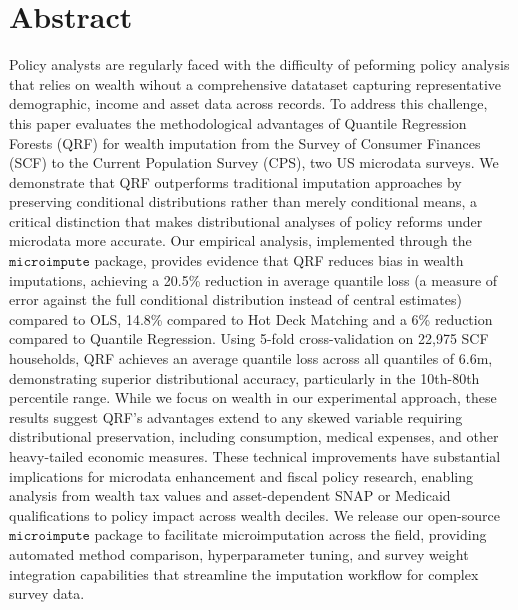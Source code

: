 \section*{Abstract}

Policy analysts are regularly faced with the difficulty of peforming policy analysis that relies on wealth wihout a comprehensive datataset capturing representative demographic, income and asset data across records. To address this challenge, this paper evaluates the methodological advantages of Quantile Regression Forests (QRF) for wealth imputation from the Survey of Consumer Finances (SCF) to the Current Population Survey (CPS), two US microdata surveys. We demonstrate that QRF outperforms traditional imputation approaches by preserving conditional distributions rather than merely conditional means, a critical distinction that makes distributional analyses of policy reforms under microdata more accurate. Our empirical analysis, implemented through the $\texttt{microimpute}$ package, provides evidence that QRF reduces bias in wealth imputations, achieving a 20.5\% reduction in average quantile loss (a measure of error against the full conditional distribution instead of central estimates) compared to OLS, 14.8\% compared to Hot Deck Matching and a 6\% reduction compared to Quantile Regression. Using 5-fold cross-validation on 22,975 SCF households, QRF achieves an average quantile loss across all quantiles of 6.6m, demonstrating superior distributional accuracy, particularly in the 10th-80th percentile range. While we focus on wealth in our experimental approach, these results suggest QRF's advantages extend to any skewed variable requiring distributional preservation, including consumption, medical expenses, and other heavy-tailed economic measures. These technical improvements have substantial implications for microdata enhancement and fiscal policy research, enabling analysis from wealth tax values and asset-dependent SNAP or Medicaid qualifications to policy impact across wealth deciles. We release our open-source $\texttt{microimpute}$ package to facilitate microimputation across the field, providing automated method comparison, hyperparameter tuning, and survey weight integration capabilities that streamline the imputation workflow for complex survey data.